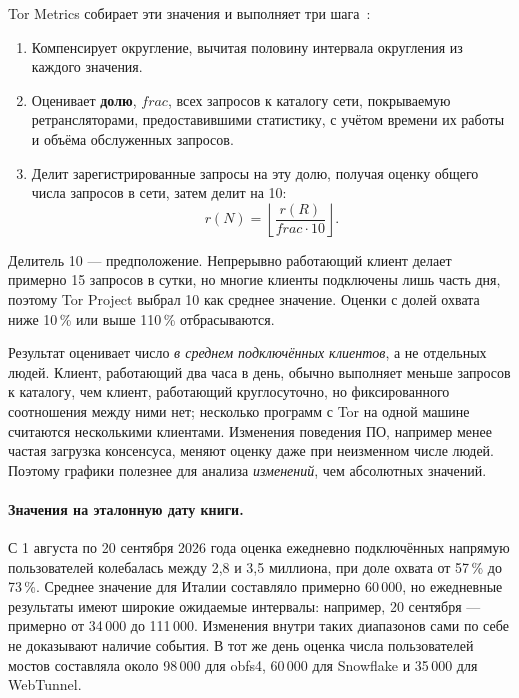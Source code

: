 Tor Metrics собирает эти значения и выполняет три шага~\cite{metricsreproducible}:
\begin{enumerate}
  \item Компенсирует округление, вычитая половину интервала округления из каждого значения.
  \item Оценивает \textbf{долю}, $\mathit{frac}$, всех запросов к каталогу сети, покрываемую ретрансляторами, предоставившими статистику, с учётом времени их работы и объёма обслуженных запросов.
  \item Делит зарегистрированные запросы на эту долю, получая оценку общего числа запросов в сети, затем делит на 10:
\[
r(N) = \left\lfloor \frac{r(R)}{\mathit{frac} \cdot 10} \right\rfloor.
\]
\end{enumerate}
Делитель 10 — предположение. Непрерывно работающий клиент делает примерно 15 запросов в сутки, но многие клиенты подключены лишь часть дня, поэтому Tor Project выбрал 10 как среднее значение. Оценки с долей охвата ниже 10\,\% или выше 110\,\% отбрасываются.

\begin{attenzione}
Результат оценивает число \emph{в среднем подключённых клиентов}, а не отдельных людей. Клиент, работающий два часа в день, обычно выполняет меньше запросов к каталогу, чем клиент, работающий круглосуточно, но фиксированного соотношения между ними нет; несколько программ с Tor на одной машине считаются несколькими клиентами. Изменения поведения ПО, например менее частая загрузка консенсуса, меняют оценку даже при неизменном числе людей. Поэтому графики полезнее для анализа \emph{изменений}, чем абсолютных значений.
\end{attenzione}

\paragraph{Значения на эталонную дату книги.} С 1 августа по 20 сентября 2026 года оценка ежедневно подключённых напрямую пользователей колебалась между 2,8 и 3,5 миллиона, при доле охвата от 57\,\% до 73\,\%. Среднее значение для Италии составляло примерно 60\,000, но ежедневные результаты имеют широкие ожидаемые интервалы: например, 20 сентября — примерно от 34\,000 до 111\,000. Изменения внутри таких диапазонов сами по себе не доказывают наличие события. В тот же день оценка числа пользователей мостов составляла около 98\,000 для obfs4, 60\,000 для Snowflake и 35\,000 для WebTunnel.

